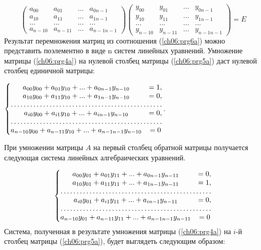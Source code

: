 \noindent\begin{equation}\label{ch06:prg6a}
\left(\begin{matrix}a_{00}&a_{01}&...&a_{0n-1}\\a_{10}&a_{11}&...&a_{1n-1}\\...&...&...&...\\a_{n-10}&a_{n-11}&...&a_{n-1n-1}\end{matrix}\right)\left(\begin{matrix}y_{00}&y_{01}&...&y_{0n-1}\\y_{10}&y_{11}&...&y_{1n-1}\\...&...&...&...\\y_{n-10}&y_{n-11}&...&y_{n-1n-1}\end{matrix}\right)=E
\end{equation}
Результат перемножения матриц из соотношения (\ref{ch06:prg6a}) можно представить поэлементно в виде n систем линейных
уравнений. Умножение матрицы (\ref{ch06:prg4a}) на нулевой столбец матрицы (\ref{ch06:prg5a}) даст нулевой столбец
единичной матрицы:

$\left\{\begin{matrix}
a_{00}y_{00}+a_{01}y_{10}+...+a_{0n-1}y_{n-10}&=1,\\
a_{10}y_{00}+a_{11}y_{10}+...+a_{1n-1}y_{n-10}&=0,\\
\hdotsfor{2}\\
a_{i0}y_{00}+a_{i1}y_{10}+...+a_{in-1}y_{n-10}&=0,\\
\hdotsfor{2}\\
a_{n-10}y_{00}+a_{n-11}y_{10}+...+a_{n-1n-1}y_{n-10}&=0
\end{matrix}\right.$.

При умножении матрицы $A$ на первый столбец обратной матрицы получается следующая система линейных алгебраических
уравнений.

\begin{equation*}
\left\{\begin{matrix}
a_{00}y_{01}+a_{01}y_{11}+...+a_{0n-1}y_{n-11}&=0,\\
a_{10}y_{01}+a_{11}y_{11}+...+a_{1n-1}y_{n-11}&=1,\\
\hdotsfor{2}\\
a_{i0}y_{01}+a_{i1}y_{11}+...+a_{in-1}y_{n-11}&=0,\\
\hdotsfor{2}\\
a_{n-10}y_{01}+a_{n-11}y_{11}+...+a_{n-1n-1}y_{n-11}&=0
\end{matrix}\right.
\end{equation*}
Система, полученная в результате умножения матрицы (\ref{ch06:prg4a}) на $i$-й столбец матрицы
(\ref{ch06:prg5a}), будет выглядеть следующим образом:

